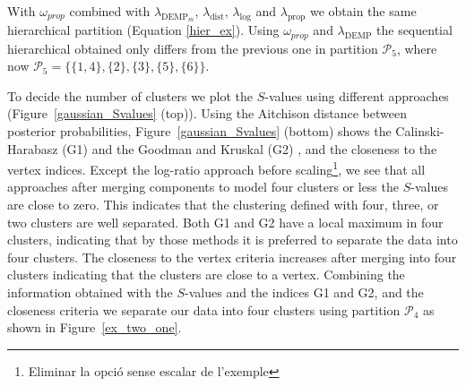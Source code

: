 \documentclass[submit]{smj}
\theoremstyle{definition}
\begin{document}
With $\omega_{prop}$ combined with $\lambda_{\text{DEMP}_m}$, $\lambda_{\text{dist}}$, $\lambda_{\log}$ and $\lambda_{\text{prop}}$ we obtain the same hierarchical partition (Equation \ref{hier_ex}). Using $\omega_{prop}$ and $\lambda_{\text{DEMP}}$ the sequential hierarchical obtained only differs from the previous one  in partition $\mathcal{P}_5$, where now $\mathcal{P}_5 = \{\{1, 4\},\{2\}, \{3\},\{5\},\{6\} \}$.

To decide the number of clusters we plot the $S$-values using different approaches (Figure~\ref{gaussian_Svalues} (top)). Using the Aitchison distance between posterior probabilities, Figure~\ref{gaussian_Svalues} (bottom) shows the Calinski-Harabasz (G1) and the Goodman and Kruskal (G2) \citep{milligan1985}, and the closeness to the vertex indices. Except the log-ratio approach {\color{red}before scaling}\footnote{Eliminar la opció sense escalar de l'exemple}, we see that all approaches after merging components to model four clusters or less the $S$-values are close to zero. This indicates that the clustering defined with four, three, or two clusters are well separated. Both G1 and G2 have a local maximum in four clusters, indicating that by those methods it is preferred to separate the data into four clusters. The closeness to the vertex criteria increases after merging into four clusters indicating that the clusters are close to a vertex. Combining the information obtained with the $S$-values and the indices G1 and G2, and the closeness criteria we separate our data into four clusters using partition $\mathcal{P}_4$ as shown in Figure~\ref{ex_two_one}.
\end{document}

